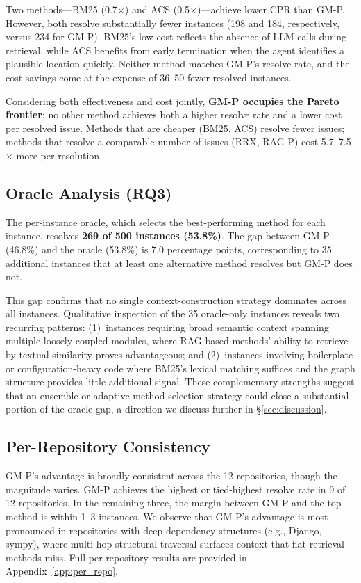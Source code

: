 Two methods---BM25 (0.7$\times$) and ACS (0.5$\times$)---achieve lower CPR than GM-P. However, both resolve substantially fewer instances (198 and 184, respectively, versus 234 for GM-P). BM25's low cost reflects the absence of LLM calls during retrieval, while ACS benefits from early termination when the agent identifies a plausible location quickly. Neither method matches GM-P's resolve rate, and the cost savings come at the expense of 36--50 fewer resolved instances.

Considering both effectiveness and cost jointly, \textbf{GM-P occupies the Pareto frontier}: no other method achieves both a higher resolve rate and a lower cost per resolved issue. Methods that are cheaper (BM25, ACS) resolve fewer issues; methods that resolve a comparable number of issues (RRX, RAG-P) cost 5.7--7.5$\times$ more per resolution.

\subsection{Oracle Analysis (RQ3)}
\label{sec:oracle}

The per-instance oracle, which selects the best-performing method for each instance, resolves \textbf{269 of 500 instances (53.8\%)}. The gap between GM-P (46.8\%) and the oracle (53.8\%) is 7.0 percentage points, corresponding to 35 additional instances that at least one alternative method resolves but GM-P does not.

This gap confirms that no single context-construction strategy dominates across all instances. Qualitative inspection of the 35 oracle-only instances reveals two recurring patterns: (1)~instances requiring broad semantic context spanning multiple loosely coupled modules, where RAG-based methods' ability to retrieve by textual similarity proves advantageous; and (2)~instances involving boilerplate or configuration-heavy code where BM25's lexical matching suffices and the graph structure provides little additional signal. These complementary strengths suggest that an ensemble or adaptive method-selection strategy could close a substantial portion of the oracle gap, a direction we discuss further in \S\ref{sec:discussion}.

\subsection{Per-Repository Consistency}

GM-P's advantage is broadly consistent across the 12 repositories, though the magnitude varies. GM-P achieves the highest or tied-highest resolve rate in 9 of 12 repositories. In the remaining three, the margin between GM-P and the top method is within 1--3 instances. We observe that GM-P's advantage is most pronounced in repositories with deep dependency structures (e.g., Django, sympy), where multi-hop structural traversal surfaces context that flat retrieval methods miss. Full per-repository results are provided in Appendix~\ref{app:per_repo}.

